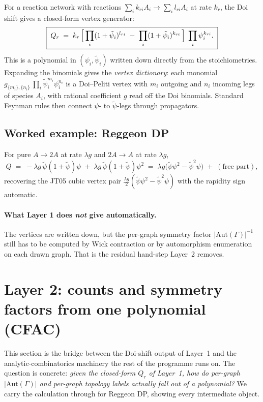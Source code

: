 \documentclass[11pt,a4paper]{article}
\begin{document}
For a reaction network with reactions $\sum_i k_{ri}A_i \to \sum_i l_{ri}A_i$
at rate $k_r$, the Doi shift gives a closed-form vertex generator:
\[
\boxed{\;
  Q_r \;=\; k_r\,\Bigl[\,\prod_i (1+\tilde\psi_i)^{l_{ri}} \;-\; \prod_i (1+\tilde\psi_i)^{k_{ri}}\,\Bigr]\;\prod_i \psi_i^{k_{ri}}.
\;}
\]
This is a polynomial in $(\psi_i, \tilde\psi_i)$ written down directly from the
stoichiometries. Expanding the binomials gives the \emph{vertex dictionary}: each
monomial $g_{\{m_i\},\{n_i\}}\,\prod_i \tilde\psi_i^{m_i}\psi_i^{n_i}$ is a
Doi--Peliti vertex with $m_i$ outgoing and $n_i$ incoming legs of species $A_i$,
with rational coefficient $g$ read off the Doi binomials. Standard Feynman rules
then connect $\psi$- to $\tilde\psi$-legs through propagators.

\subsection{Worked example: Reggeon DP}

For pure $A \to 2A$ at rate $\lambda g$ and $2A \to A$ at rate $\lambda g$,
\[
Q \;=\; -\lambda g\,\tilde\psi(1+\tilde\psi)\psi \;+\; \lambda g\,\tilde\psi(1+\tilde\psi)\psi^2
\;=\; \lambda g\bigl(\tilde\psi\psi^2 - \tilde\psi^2\psi\bigr) \;+\;(\text{free part}),
\]
recovering the JT05 cubic vertex pair $\tfrac{\lambda g}{2}(\tilde\psi\psi^2 - \tilde\psi^2\psi)$
with the rapidity sign automatic.

\paragraph{What Layer 1 does \emph{not} give automatically.} The vertices are
written down, but the per-graph symmetry factor $|\mathrm{Aut}(\Gamma)|^{-1}$
still has to be computed by Wick contraction or by automorphism enumeration
on each drawn graph. That is the residual hand-step Layer~2 removes.

\section{Layer 2: counts and symmetry factors from one polynomial (CFAC)}

This section is the bridge between the Doi-shift output of Layer~1 and the
analytic-combinatorics machinery the rest of the programme runs on. The
question is concrete: \emph{given the closed-form $Q_r$ of Layer~1, how
do per-graph $|\mathrm{Aut}(\Gamma)|$ and per-graph topology labels actually
fall out of a polynomial?} We carry the calculation through for Reggeon DP,
showing every intermediate object.
\end{document}
